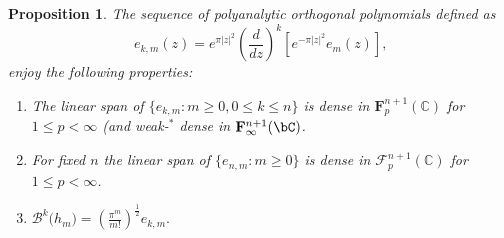 \documentclass[12pt]{amsart}
\theoremstyle{plain}
\newtheorem{proposition}{Proposition}
\numberwithin{equation}{section}
\begin{document}
\begin{proposition}
\label{densityhm} The sequence of polyanalytic orthogonal polynomials
defined as 
\begin{equation*}
e_{k,m}(z)=e^{\pi \left\vert z\right\vert ^{2}}\left( \frac{d}{dz}\right)
^{k}\left[ e^{-\pi \left\vert z\right\vert ^{2}}e_{m}(z)\right] \text{,}
\end{equation*}%
enjoy the following properties:

\begin{enumerate}
\item The linear span of $\{e_{k,m} : m\geq 0,0\leq k\leq n\}$ is dense in $%
\mathbf{F}_{p}^{n+1}(%
\mathbb{C}
)$ for $1\leq p < \infty $ (and weak-$^*$ dense in $\mathbf{F} ^{n+1}_\infty
(\bC )$.

\item For fixed $n$ the linear span of $\{e_{n,m}: m\geq 0 \}$ is dense in $%
\mathcal{F}_{p}^{n+1}(%
\mathbb{C}
)$ for $1\leq p < \infty $.

\item $\mathcal{B}^{k}\mathcal{(}h_{m})\mathcal{=}\left( \frac{\pi ^{m}}{m!}%
\right) ^{\frac{1}{2}}e_{k,m}.$
\end{enumerate}
\end{proposition}
\end{document}
